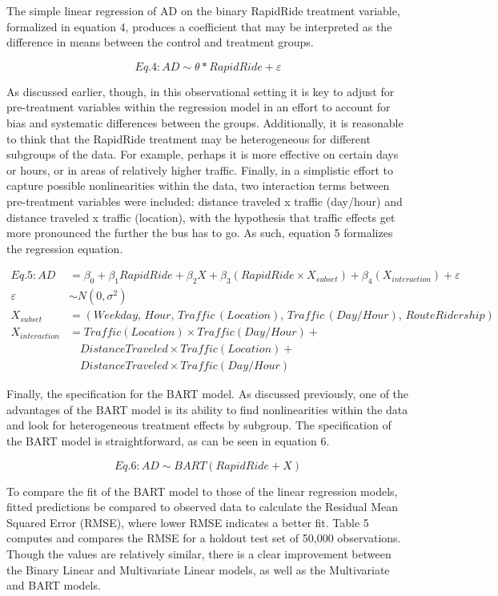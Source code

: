 \documentclass[
  12pt,
]{article}
\begin{document}
The simple linear regression of AD on the binary RapidRide treatment
variable, formalized in equation 4, produces a coefficient that may be
interpreted as the difference in means between the control and treatment
groups.

\[Eq. 4: AD \sim \theta*RapidRide + \varepsilon\]

As discussed earlier, though, in this observational setting it is key to
adjust for pre-treatment variables within the regression model in an
effort to account for bias and systematic differences between the
groups. Additionally, it is reasonable to think that the RapidRide
treatment may be heterogeneous for different subgroups of the data. For
example, perhaps it is more effective on certain days or hours, or in
areas of relatively higher traffic. Finally, in a simplistic effort to
capture possible nonlinearities within the data, two interaction terms
between pre-treatment variables were included: distance traveled x
traffic (day/hour) and distance traveled x traffic (location), with the
hypothesis that traffic effects get more pronounced the further the bus
has to go. As such, equation 5 formalizes the regression equation.

\[
\begin{aligned}
Eq. 5: AD &= \beta_0 + \beta_1 RapidRide + \beta_2 X + \beta_3 (RapidRide \times X_{subset}) + \beta_4 (X_{interaction}) + \varepsilon \\
\varepsilon &\sim N(0, \sigma^2) \\
X_{subset} &= (Weekday,\, Hour,\, Traffic\,(Location),\, Traffic\,(Day/Hour),\, RouteRidership) \\
X_{interaction} &= Traffic(Location) \times Traffic(Day/Hour) + \\
&\quad DistanceTraveled \times Traffic(Location) + \\
&\quad DistanceTraveled \times Traffic(Day/Hour)
\end{aligned}
\]

Finally, the specification for the BART model. As discussed previously,
one of the advantages of the BART model is its ability to find
nonlinearities within the data and look for heterogeneous treatment
effects by subgroup. The specification of the BART model is
straightforward, as can be seen in equation 6.

\[Eq. 6: AD \sim BART(RapidRide + X)\]

To compare the fit of the BART model to those of the linear regression
models, fitted predictions be compared to observed data to calculate the
Residual Mean Squared Error (RMSE), where lower RMSE indicates a better
fit. Table 5 computes and compares the RMSE for a holdout test set of
50,000 observations. Though the values are relatively similar, there is
a clear improvement between the Binary Linear and Multivariate Linear
models, as well as the Multivariate and BART models.
\end{document}
